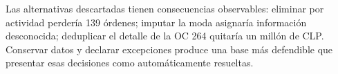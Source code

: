 \documentclass[12pt,letterpaper]{article}
\begin{document}
Las alternativas descartadas tienen consecuencias observables: eliminar por
actividad perdería 139 órdenes; imputar la moda asignaría información desconocida;
deduplicar el detalle de la OC 264 quitaría un millón de CLP. Conservar datos y
declarar excepciones produce una base más defendible que presentar esas decisiones
como automáticamente resueltas.





\clearpage

\end{document}
